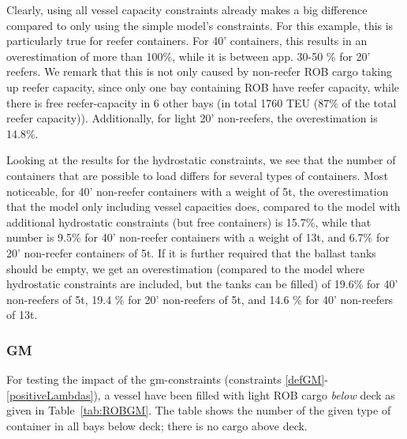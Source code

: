 Clearly, using all vessel capacity constraints already makes a big difference compared to only using the simple model's constraints. For this example, this is particularly true for reefer containers. For 40' containers, this results in an overestimation of more than 100\%, while it is between app. 30-50 \% for 20' reefers. We remark that this is not only caused by non-reefer ROB cargo taking up reefer capacity, since only one bay containing ROB have reefer capacity, while there is free reefer-capacity in 6 other bays (in total 1760 TEU (87\% of the total reefer capacity)).  Additionally, for light 20' non-reefers, the overestimation is 14.8\%.

Looking at the results for the hydrostatic constraints, we see that the number of containers that are possible to load differs for several types of containers. Most noticeable, for 40' non-reefer containers with a weight of 5t, the overestimation that the model only including vessel capacities does, compared to the model with additional hydrostatic constraints (but free containers) is 15.7\%, while that number is 9.5\% for 40' non-reefer containers with a weight of 13t, and 6.7\% for 20' non-reefer containers of 5t. If it is further required that the ballast tanks should be empty, we get an overestimation (compared to the model where hydrostatic constraints are included, but the tanks can be filled) of 19.6\% for 40' non-reefers of 5t, 19.4 \% for 20' non-reefers of 5t, and 14.6 \% for 40' non-reefers of 13t.

\subsubsection{GM}
For testing the impact of the gm-constraints (constraints \eqref{defGM}-\eqref{positiveLambdas}), a vessel have been filled with light ROB cargo \emph{below} deck as given in Table~\ref{tab:ROBGM}. The table shows the number of the given type of container in all bays below deck; there is no cargo above deck.\\

